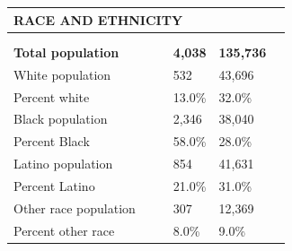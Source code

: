 \documentclass[9pt]{report}
\begin{document}
\vspace{12pt}
\setlength{\tabcolsep}{.01in} %
\begin{tabular}{p{.10in}p{.10in}p{.10in}p{3.7in}>{\hfill}p{.85in}>{\hfill}p{.85in}>{\hfill}p{.85in}>{\hfill}p{.85in}p{0.1in}}
\multicolumn{9}{l}{\parbox{7.1in}{\raggedright{\large{\strut\textbf{RACE AND ETHNICITY}\strut}}}} \\ 
\hline
\multicolumn{4}{l}{\parbox{3.5in}{\raggedright{\textbf{}}}} & \multicolumn{1}{r}{\parbox{.85in}{\strut\raggedleft{\textbf{}\strut}}} & \multicolumn{1}{r}{\parbox{.85in}{\strut\raggedleft{\textbf{}\strut}}} & \multicolumn{1}{r}{\parbox{.85in}{\strut{}}} & \multicolumn{1}{r}{\parbox{.85in}{\strut{}}} & \\ 
\multicolumn{9}{l}{} \\ 
\multicolumn{4}{l}{\parbox{3.5in}{\strut\raggedright{\textbf{Total population}\strut}}} & \textbf{} & \textbf{} & \textbf{4,038} & \textbf{135,736} & \textbf{} \\ 
\multicolumn{4}{l}{\parbox{3.6in}{\strut\raggedright{{White population}}\strut}} &  &  & 532 & 43,696 & \multicolumn{1}{l}{}  \\ 
\multicolumn{4}{l}{\parbox{3.6in}{\strut\raggedright{{Percent white}}\strut}} &  &  & 13.0\% & 32.0\% & \multicolumn{1}{l}{}  \\ 
\multicolumn{4}{l}{\parbox{3.6in}{\strut\raggedright{{Black population}}\strut}} &  &  & 2,346 & 38,040 & \multicolumn{1}{l}{}  \\ 
\multicolumn{4}{l}{\parbox{3.6in}{\strut\raggedright{{Percent Black}}\strut}} &  &  & 58.0\% & 28.0\% & \multicolumn{1}{l}{}  \\ 
\multicolumn{4}{l}{\parbox{3.6in}{\strut\raggedright{{Latino population}}\strut}} &  &  & 854 & 41,631 & \multicolumn{1}{l}{}  \\ 
\multicolumn{4}{l}{\parbox{3.6in}{\strut\raggedright{{Percent Latino}}\strut}} &  &  & 21.0\% & 31.0\% & \multicolumn{1}{l}{}  \\ 
\multicolumn{4}{l}{\parbox{3.6in}{\strut\raggedright{{Other race population}}\strut}} &  &  & 307 & 12,369 & \multicolumn{1}{l}{}  \\ 
\multicolumn{4}{l}{\parbox{3.6in}{\strut\raggedright{{Percent other race}}\strut}} &  &  & 8.0\% & 9.0\% & \multicolumn{1}{l}{}  \\ 

\end{tabular}
\setlength{\tabcolsep}{6pt} %
\end{document}
